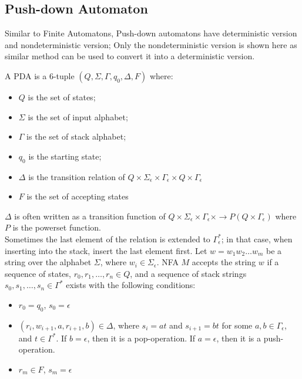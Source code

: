 \documentclass{report}
\begin{document}
		\subsection{Push-down Automaton}
			Similar to Finite Automatons, Push-down automatons have deterministic version and nondeterministic version; Only the nondeterministic version is shown here as similar method can be used to convert it into a deterministic version.
			\begin{defn} \label{def_pda}
				A PDA is a 6-tuple $(Q,\Sigma,\Gamma,q_0,\Delta,F)$ where:
				\begin{itemize}
					\item $Q$ is the set of states;
					\item $\Sigma$ is the set of input alphabet;
					\item $\Gamma$ is the set of stack alphabet;
					\item $q_0$ is the starting state;
					\item $\Delta$ is the transition relation of $Q \times \Sigma_\epsilon \times \Gamma_\epsilon \times Q \times \Gamma_\epsilon$
					\item $F$ is the set of accepting states
				\end{itemize}
				$\Delta$ is often written as a transition function of $Q \times \Sigma_\epsilon \times \Gamma_\epsilon \times \rightarrow P(Q \times \Gamma_\epsilon)$ where $P$ is the powerset function.\\
				Sometimes the last element of the relation is extended to $\Gamma_\epsilon^*$; in that case, when inserting into the stack, insert the last element first.
				Let $w=w_1w_2\dots w_m$ be a string over the alphabet $\Sigma$, where $w_i \in \Sigma_\epsilon$. NFA $M$ accepts the string $w$ if a sequence of states, $r_0,r_1,\dots,r_n \in Q$, and a sequence of stack strings $s_0,s_1,\dots,s_n \in \Gamma^*$ exists with the following conditions:
				\begin{itemize}
					\item $r_0=q_0$, $s_0=\epsilon$
					\item $(r_i,w_{i+1},a,r_{i+1},b)\in \Delta$, where $s_i=at$ and $s_{i+1}=bt$ for some $a,b \in \Gamma_\epsilon$, and $t \in \Gamma^*$.
					\subitem If $b=\epsilon$, then it is a pop-operation. If $a=\epsilon$, then it is a push-operation.
					\item $r_m \in F$, $s_m=\epsilon$
				\end{itemize}
			\end{defn}
			
\end{document}
